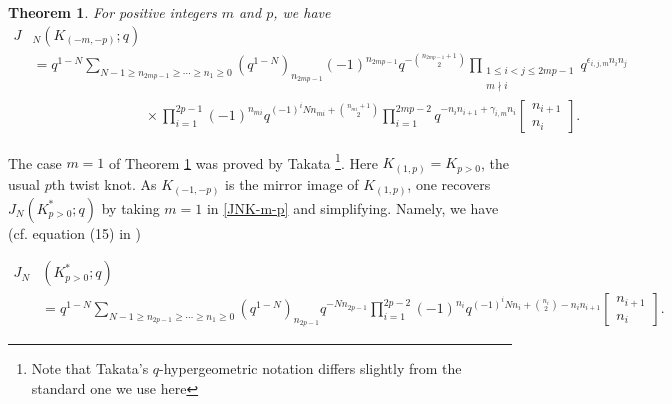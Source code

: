 \documentclass[11pt,reqno]{amsart}
\newtheorem{theorem}{Theorem}[section]
\theoremstyle{definition}
\numberwithin{equation}{section}
\begin{document}
\begin{theorem} \label{main1}
For positive integers $m$ and $p$, we have
\begin{equation} \label{JNK-m-p}
\begin{aligned}
J&_{N}(K_{(-m,-p)}; q) \\ 
&= q^{1-N}\sum_{N-1 \geq n_{2mp-1} \geq \cdots \geq n_1 \geq 0} (q^{1-N})_{n_{2mp-1}} (-1)^{n_{2mp-1}} q^{-\binom{n_{2mp-1} + 1}{2}} \prod_{\substack{1 \leq i < j \leq 2mp-1 \\ m \nmid i}} q^{\epsilon_{i,j,m}n_in_j} \\
&  \qquad \qquad \qquad \qquad \times \prod_{i=1}^{2p-1} (-1)^{n_{mi}} q^{(-1)^{i} N n_{mi} + \binom{n_{mi} + 1}{2}} \prod_{i=1}^{2mp - 2} q^{-n_i n_{i+1} + \gamma_{i, m} n_i}\begin{bmatrix} n_{i+1} \\ n_{i} \end{bmatrix}. 
\end{aligned}
\end{equation}
\end{theorem}

The case $m=1$ of Theorem \ref{main1} was proved by Takata \cite{takata}\footnote{Note that Takata's $q$-hypergeometric notation differs slightly from the standard one we use here}.   Here $K_{(1,p)}=K_{p>0}$, the usual $p$th twist knot.  As $K_{(-1,-p)}$ is the mirror image of $K_{(1,p)}$, one recovers
$J_{N}(K_{p>0}^{*}; q)$ by taking $m=1$ in \eqref{JNK-m-p} and simplifying. Namely, we have (cf. equation (15) in \cite{takata})

\begin{equation} \label{kppos}
\begin{aligned}
J_{N}&(K_{p>0}^{*}; q) \\
& = q^{1-N}\sum_{N-1 \geq n_{2p-1} \geq \cdots \geq n_1 \geq 0} (q^{1-N})_{n_{2p-1}}  q^{-Nn_{2p-1}} \prod_{i=1}^{2p-2} (-1)^{n_{i}} q^{(-1)^{i} N n_{i} + \binom{n_{i}}{2} -n_i n_{i+1}} \begin{bmatrix} n_{i+1} \\ n_{i} \end{bmatrix}. 
\end{aligned}
\end{equation}
\end{document}
